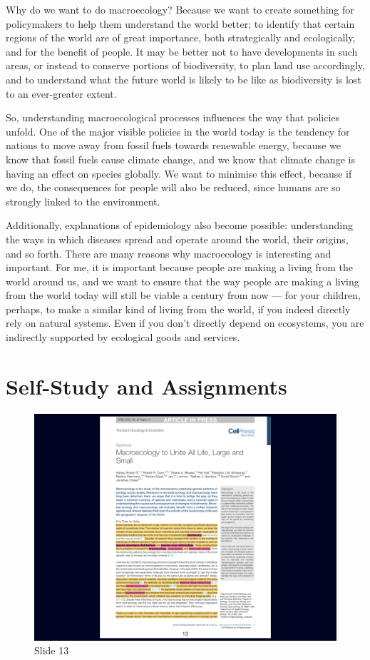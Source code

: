 \documentclass[
  12pt,
]{book}
\begin{document}
Why do we want to do macroecology? Because we want to create something
for policymakers to help them understand the world better; to identify
that certain regions of the world are of great importance, both
strategically and ecologically, and for the benefit of people. It may be
better not to have developments in such areas, or instead to conserve
portions of biodiversity, to plan land use accordingly, and to
understand what the future world is likely to be like as biodiversity is
lost to an ever-greater extent.

So, understanding macroecological processes influences the way that
policies unfold. One of the major visible policies in the world today is
the tendency for nations to move away from fossil fuels towards
renewable energy, because we know that fossil fuels cause climate
change, and we know that climate change is having an effect on species
globally. We want to minimise this effect, because if we do, the
consequences for people will also be reduced, since humans are so
strongly linked to the environment.

Additionally, explanations of epidemiology also become possible:
understanding the ways in which diseases spread and operate around the
world, their origins, and so forth. There are many reasons why
macroecology is interesting and important. For me, it is important
because people are making a living from the world around us, and we want
to ensure that the way people are making a living from the world today
will still be viable a century from now --- for your children, perhaps,
to make a similar kind of living from the world, if you indeed directly
rely on natural systems. Even if you don't directly depend on
ecosystems, you are indirectly supported by ecological goods and
services.

\section{Self-Study and Assignments}\label{self-study-and-assignments}

\begin{figure}[ht]
\centering
\includegraphics[width=0.8\linewidth]{../images/BDC334/BDC334-013.jpeg}
\caption*{Slide 13}
\end{figure}
\end{document}
